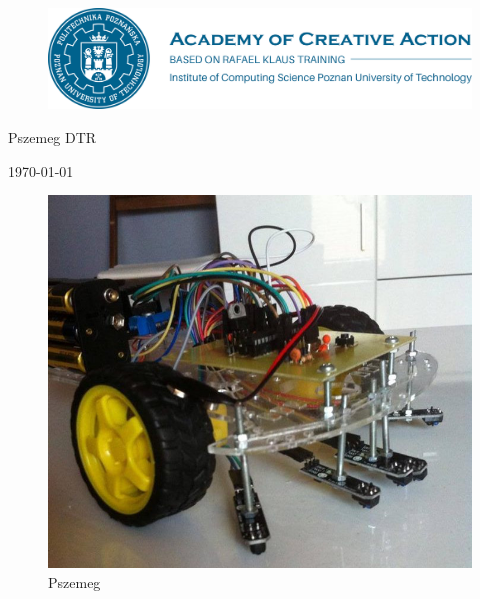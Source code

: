\documentclass[a4paper,11pt]{article}
\def\SCALE{0.6}
\begin{document}
\begin{center}


\begin{figure}[htp]
	\centering
	\includegraphics[width=\SCALE
	\paperwidth]{logoakd}
\end{figure}


\vspace{0.5cm}
\begin{LARGE}
Pszemeg DTR
\end{LARGE}

\vspace{0.5cm}
\today
\vspace{0.5cm}

\begin{figure}[H]
	\centering
	\includegraphics[width=\SCALE
	\paperwidth]{Pszemeg}
	\caption{Pszemeg}
\end{figure}


\end{center}
\end{document}
